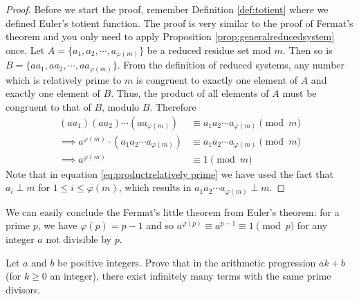 	\begin{proof}
		Before we start the proof, remember Definition \ref{def:totient} where we defined Euler's totient function. The proof is very similar to the proof of Fermat's theorem and you only need to apply Proposition \ref{prop:generalreducedsystem} once. Let $A=\{a_1, a_2, \cdots, a_{\varphi(m)}\}$ be a reduced residue set mod $m$. Then so is $B=\{aa_1, aa_2, \cdots, aa_{\varphi(m)}\}$. From the definition of reduced systems, any number which is relatively prime to $m$ is congruent to exactly one element of $A$ and exactly one element of $B$. Thus, the product of all elements of $A$ must be congruent to that of $B$, modulo $B$. Therefore
		\begin{align}
			(aa_1) (aa_2) \cdots (aa_{\varphi(m)})
				&\equiv a_1 a_2 \cdots a_{\varphi(m)}\pmod m\nonumber\\
		\implies a^{\varphi(m)} \cdot \left( a_1 a_2 \cdots a_{\varphi(m)}\right)
			& \equiv a_1 a_2 \cdots a_{\varphi(m)} \pmod m\nonumber\\\label{eq:productrelatively prime}
		\implies a^{\varphi(m)}
			&\equiv 1\pmod m
		\end{align}
		Note that in equation \eqref{eq:productrelatively prime} we have used the fact that $a_i \perp m$ for $1 \leq i \leq \varphi(m)$, which results in $a_1 a_2 \cdots a_{\varphi(m)} \perp m$.
	\end{proof}
We can easily conclude the Fermat's little theorem from Euler's theorem: for a prime $p$, we have $\varphi(p)=p-1$ and so $a^{\varphi(p)} \equiv a^{p-1} \equiv 1 \pmod p$ for any integer $a$ not divisible by $p$.
	\begin{problem}
		Let $a$ and $b$ be positive integers. Prove that in the arithmetic progression $ak+b$ (for $k \geq 0$ an integer), there exist infinitely many terms with the same prime divisors.
	\end{problem}

